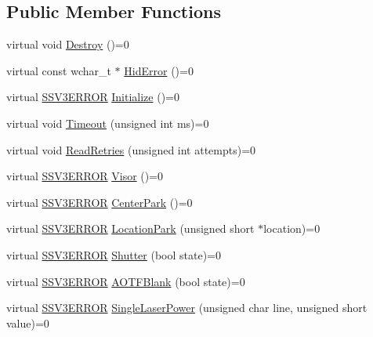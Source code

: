\subsection*{Public Member Functions}
\begin{DoxyCompactItemize}
\item 
virtual void \hyperlink{classSSV3_1_1Controller_a04e0349b6adf3231bc57e6d7777861e6}{Destroy} ()=0
\item 
virtual const wchar\+\_\+t $\ast$ \hyperlink{classSSV3_1_1Controller_afa08d143fcf2c1e9974ac212fc816ed2}{Hid\+Error} ()=0
\item 
virtual \hyperlink{classSSV3_1_1Controller_a8ff24a92ec373aa1257dcfe2aa2e5406}{S\+S\+V3\+E\+R\+R\+OR} \hyperlink{classSSV3_1_1Controller_a09aad77f26ef4f1ae27746234188e9f1}{Initialize} ()=0
\item 
virtual void \hyperlink{classSSV3_1_1Controller_a44aa242157905527164269a57f4c0156}{Timeout} (unsigned int ms)=0
\item 
virtual void \hyperlink{classSSV3_1_1Controller_a8d1f7d629d46b94e92e0c580bc5ae24f}{Read\+Retries} (unsigned int attempts)=0
\item 
virtual \hyperlink{classSSV3_1_1Controller_a8ff24a92ec373aa1257dcfe2aa2e5406}{S\+S\+V3\+E\+R\+R\+OR} \hyperlink{classSSV3_1_1Controller_a8abc66a0ff313b8689a716b43ce696d2}{Visor} ()=0
\item 
virtual \hyperlink{classSSV3_1_1Controller_a8ff24a92ec373aa1257dcfe2aa2e5406}{S\+S\+V3\+E\+R\+R\+OR} \hyperlink{classSSV3_1_1Controller_a4d2e70f3ffd7fe0e00dcaeaa9981cd9f}{Center\+Park} ()=0
\item 
virtual \hyperlink{classSSV3_1_1Controller_a8ff24a92ec373aa1257dcfe2aa2e5406}{S\+S\+V3\+E\+R\+R\+OR} \hyperlink{classSSV3_1_1Controller_aa40583d5f5c907efc09a76256516b7d4}{Location\+Park} (unsigned short $\ast$location)=0
\item 
virtual \hyperlink{classSSV3_1_1Controller_a8ff24a92ec373aa1257dcfe2aa2e5406}{S\+S\+V3\+E\+R\+R\+OR} \hyperlink{classSSV3_1_1Controller_a1000e02a14b2ca598a9f2f851a05c4ed}{Shutter} (bool state)=0
\item 
virtual \hyperlink{classSSV3_1_1Controller_a8ff24a92ec373aa1257dcfe2aa2e5406}{S\+S\+V3\+E\+R\+R\+OR} \hyperlink{classSSV3_1_1Controller_a72eeeb9dec872bbcb230bb251c8439a4}{A\+O\+T\+F\+Blank} (bool state)=0
\item 
virtual \hyperlink{classSSV3_1_1Controller_a8ff24a92ec373aa1257dcfe2aa2e5406}{S\+S\+V3\+E\+R\+R\+OR} \hyperlink{classSSV3_1_1Controller_abd7191a0acc48689c737ec9cb820de58}{Single\+Laser\+Power} (unsigned char line, unsigned short value)=0

\end{DoxyCompactItemize}
